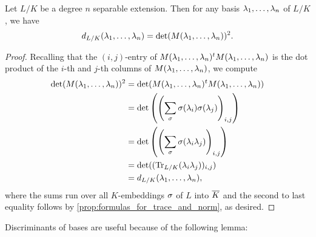     \begin{proposition}\label{disc_as_square_of_embedding_matrix}
      Let $L/K$ be a degree $n$ separable extension. Then for any basis $\lambda_{1},\ldots,\lambda_{n}$ of $L/K$, we have
      \[
        d_{L/K}(\lambda_{1},\ldots,\lambda_{n}) = \det(M(\lambda_{1},\ldots,\lambda_{n}))^{2}.
      \]
    \end{proposition}
    \begin{proof}
      Recalling that the $(i,j)$-entry of $M(\lambda_{1},\ldots,\lambda_{n})^{t}M(\lambda_{1},\ldots,\lambda_{n})$ is the dot product of the $i$-th and $j$-th columns of $M(\lambda_{1},\ldots,\lambda_{n})$, we compute
      \begin{align*}
        \det(M(\lambda_{1},\ldots,\lambda_{n}))^{2} &= \det(M(\lambda_{1},\ldots,\lambda_{n})^{t}M(\lambda_{1},\ldots,\lambda_{n})) \\
        &= \det\left(\left(\sum_{\sigma}\sigma(\lambda_{i})\sigma(\lambda_{j})\right)_{i,j}\right) \\
        &= \det\left(\left(\sum_{\sigma}\sigma(\lambda_{i}\lambda_{j})\right)_{i,j}\right) \\
        &= \det((\operatorname{\mathrm{Tr}}_{L/K}(\lambda_{i}\lambda_{j}))_{i,j}) \\
        &= d_{L/K}(\lambda_{1},\ldots,\lambda_{n}),
      \end{align*}
      where the sums run over all $K$-embeddings $\sigma$ of $L$ into $\overline{K}$ and the second to last equality follows by \cref{prop:formulas_for_trace_and_norm}, as desired.
    \end{proof}

    Discriminants of bases are useful because of the following lemma:

